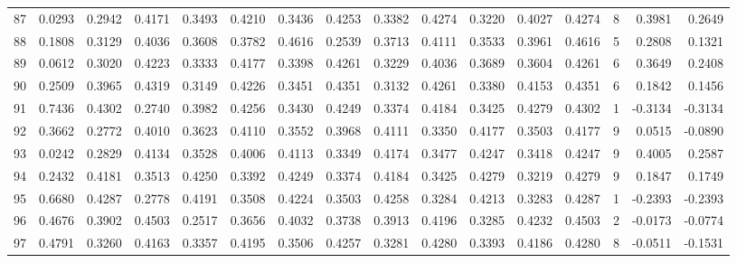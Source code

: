 \begin{tabular}{lrrrrrrrrrrrrrrr}
87  &      0.0293 &  0.2942 &  0.4171 &  0.3493 &  0.4210 &  0.3436 &  0.4253 &  0.3382 &  0.4274 &  0.3220 &   0.4027 &     0.4274 &      8 &                    0.3981 &                     0.2649 \\
88  &      0.1808 &  0.3129 &  0.4036 &  0.3608 &  0.3782 &  0.4616 &  0.2539 &  0.3713 &  0.4111 &  0.3533 &   0.3961 &     0.4616 &      5 &                    0.2808 &                     0.1321 \\
89  &      0.0612 &  0.3020 &  0.4223 &  0.3333 &  0.4177 &  0.3398 &  0.4261 &  0.3229 &  0.4036 &  0.3689 &   0.3604 &     0.4261 &      6 &                    0.3649 &                     0.2408 \\
90  &      0.2509 &  0.3965 &  0.4319 &  0.3149 &  0.4226 &  0.3451 &  0.4351 &  0.3132 &  0.4261 &  0.3380 &   0.4153 &     0.4351 &      6 &                    0.1842 &                     0.1456 \\
91  &      0.7436 &  0.4302 &  0.2740 &  0.3982 &  0.4256 &  0.3430 &  0.4249 &  0.3374 &  0.4184 &  0.3425 &   0.4279 &     0.4302 &      1 &                   -0.3134 &                    -0.3134 \\
92  &      0.3662 &  0.2772 &  0.4010 &  0.3623 &  0.4110 &  0.3552 &  0.3968 &  0.4111 &  0.3350 &  0.4177 &   0.3503 &     0.4177 &      9 &                    0.0515 &                    -0.0890 \\
93  &      0.0242 &  0.2829 &  0.4134 &  0.3528 &  0.4006 &  0.4113 &  0.3349 &  0.4174 &  0.3477 &  0.4247 &   0.3418 &     0.4247 &      9 &                    0.4005 &                     0.2587 \\
94  &      0.2432 &  0.4181 &  0.3513 &  0.4250 &  0.3392 &  0.4249 &  0.3374 &  0.4184 &  0.3425 &  0.4279 &   0.3219 &     0.4279 &      9 &                    0.1847 &                     0.1749 \\
95  &      0.6680 &  0.4287 &  0.2778 &  0.4191 &  0.3508 &  0.4224 &  0.3503 &  0.4258 &  0.3284 &  0.4213 &   0.3283 &     0.4287 &      1 &                   -0.2393 &                    -0.2393 \\
96  &      0.4676 &  0.3902 &  0.4503 &  0.2517 &  0.3656 &  0.4032 &  0.3738 &  0.3913 &  0.4196 &  0.3285 &   0.4232 &     0.4503 &      2 &                   -0.0173 &                    -0.0774 \\
97  &      0.4791 &  0.3260 &  0.4163 &  0.3357 &  0.4195 &  0.3506 &  0.4257 &  0.3281 &  0.4280 &  0.3393 &   0.4186 &     0.4280 &      8 &                   -0.0511 &                    -0.1531 \\

\end{tabular}
